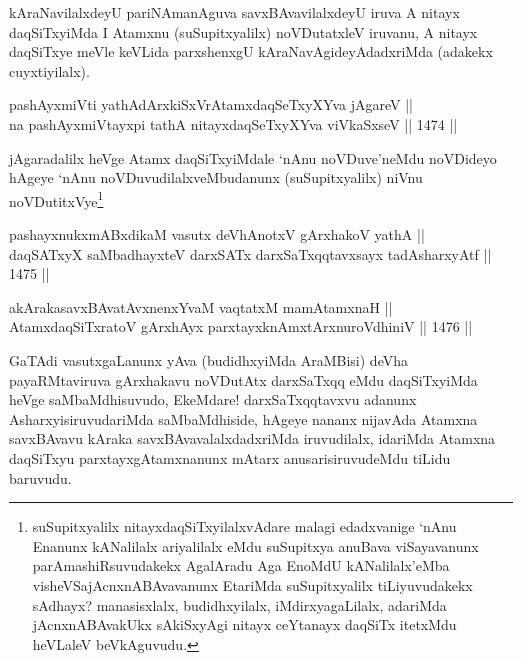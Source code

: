 \begin{artha}
kAraNavilalxdeyU pariNAmanAguva savxBAvavilalxdeyU iruva A nitayx daqSiTxyiMda I Atamxnu (suSupitxyalilx) noVDutatxleV iruvanu, A nitayx daqSiTxye meVle keVLida parxshenxgU kAraNavAgideyAdadxriMda (adakekx cuyxtiyilalx).
\end{artha}


\begin{shl}
pashAyxmiVti yathA\s dArxkiSxVrAtamxdaqSeTxyXYva jAgareV || \\
na pashAyxmiVtayxpi tathA nitayxdaqSeTxyXYva viVkaSxseV \hfill || 1474 ||  
\end{shl}

\begin{artha}
jAgaradalilx heVge Atamx daqSiTxyiMdale `nAnu noVDuve'neMdu noVDideyo hAgeye `nAnu noVDuvudilalxveMbudanunx (suSupitxyalilx) niVnu noVDutitxVye\footnote{suSupitxyalilx nitayxdaqSiTxyilalxvAdare malagi edadxvanige `nAnu Enanunx kANalilalx ariyalilalx eMdu suSupitxya anuBava viSayavanunx parAmashiRsuvudakekx AgalAradu Aga EnoMdU kANalilalx'eMba visheVSajAcnxnABAvavanunx EtariMda suSupitxyalilx tiLiyuvudakekx sAdhayx? manasisxlalx, budidhxyilalx, iMdirxyagaLilalx, adariMda jAcnxnABAvakUkx sAkiSxyAgi nitayx ceYtanayx daqSiTx itetxMdu heVLaleV beVkAguvudu.} 
\end{artha}


\begin{shl}
pashayxnukxmABxdikaM vasutx deVhAnotxV gArxhakoV yathA || \\
daqSATxyX saMbadhayxteV darxSATx darxSaTxqqtavxsayx tadAsharxyAtf \hfill || 1475 ||  
\end{shl}
				
\begin{shl}
akArakasavxBAvatAvxnenxYvaM vaqtatxM mamA\s \s tamxnaH ||  \\
AtamxdaqSiTxratoV gArxhAyx parxtayxknAmxtArxnuroVdhiniV \hfill || 1476 ||  
\end{shl}

\begin{artha}
GaTAdi vasutxgaLanunx yAva (budidhxyiMda AraMBisi) deVha payaRMtaviruva gArxhakavu noVDutAtx darxSaTxqq eMdu daqSiTxyiMda heVge saMbaMdhisuvudo, EkeMdare! darxSaTxqqtavxvu adanunx AsharxyisiruvudariMda saMbaMdhiside, hAgeye nananx nijavAda Atamxna savxBAvavu kAraka savxBAvavalalxdadxriMda iruvudilalx, idariMda Atamxna daqSiTxyu parxtayxgAtamxnanunx mAtarx anusarisiruvudeMdu tiLidu baruvudu.
\end{artha}

